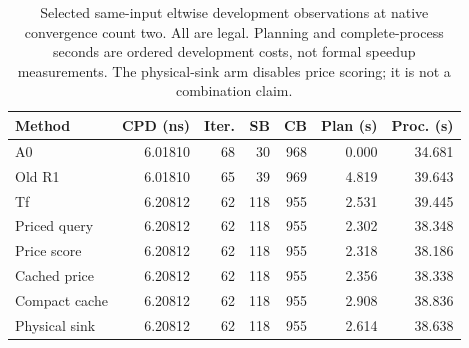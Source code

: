 \begin{table}[t]
\centering
\caption{Selected same-input eltwise development observations at native convergence count two. All are legal. Planning and complete-process seconds are ordered development costs, not formal speedup measurements. The physical-sink arm disables price scoring; it is not a combination claim.}
\label{tab:candidate-path-dev}
\scriptsize
\begin{tabular}{lrrrrrr}
\hline
Method & CPD (ns) & Iter. & SB & CB & Plan (s) & Proc. (s) \\
\hline
A0 & 6.01810 & 68 & 30 & 968 & 0.000 & 34.681 \\
Old R1 & 6.01810 & 65 & 39 & 969 & 4.819 & 39.643 \\
Tf & 6.20812 & 62 & 118 & 955 & 2.531 & 39.445 \\
Priced query & 6.20812 & 62 & 118 & 955 & 2.302 & 38.348 \\
Price score & 6.20812 & 62 & 118 & 955 & 2.318 & 38.186 \\
Cached price & 6.20812 & 62 & 118 & 955 & 2.356 & 38.338 \\
Compact cache & 6.20812 & 62 & 118 & 955 & 2.908 & 38.836 \\
Physical sink & 6.20812 & 62 & 118 & 955 & 2.614 & 38.638 \\
\hline
\end{tabular}
\end{table}
